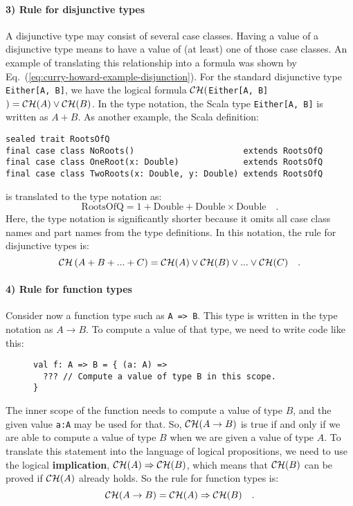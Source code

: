 \paragraph{3) Rule for disjunctive types}

A disjunctive type may consist of several case classes. Having a value
of a disjunctive type means to have a value of (at least) one of those
case classes. An example of translating this relationship into a formula
was shown by Eq.~(\ref{eq:curry-howard-example-disjunction}). For
the standard disjunctive type \lstinline!Either[A, B]!, we have the
logical formula ${\cal CH}($\lstinline!Either[A, B]!$)={\cal CH}(A)\vee{\cal CH}(B)$.
In the type notation, the Scala type \lstinline!Either[A, B]! is
written as $A+B$. As another example, the Scala definition:
\begin{lstlisting}
sealed trait RootsOfQ
final case class NoRoots()                      extends RootsOfQ
final case class OneRoot(x: Double)             extends RootsOfQ
final case class TwoRoots(x: Double, y: Double) extends RootsOfQ
\end{lstlisting}
is translated to the type notation as:
\[
\text{RootsOfQ}=1+\text{Double}+\text{Double}\times\text{Double}\quad.
\]
Here, the type notation is significantly shorter because it omits
all case class names and part names from the type definitions. In
this notation, the rule for disjunctive types is:
\[
{\cal CH}\left(A+B+...+C\right)={\cal CH}(A)\vee{\cal CH}(B)\vee...\vee{\cal CH}(C)\quad.
\]


\paragraph{4) Rule for function types}

Consider now a function type such as \lstinline!A => B!. This type
is written in the type notation as $A\rightarrow B$. To compute a
value of that type, we need to write code like this:

\begin{wrapfigure}{l}{0.5\columnwidth}%
\vspace{-0.65\baselineskip}
\begin{lstlisting}
val f: A => B = { (a: A) =>
  ??? // Compute a value of type B in this scope.
}
\end{lstlisting}

\vspace{-0.9\baselineskip}
\end{wrapfigure}%

\noindent The inner scope of the function needs to compute a value
of type $B$, and the given value \lstinline!a:A! may be used for
that. So, ${\cal CH}(A\rightarrow B)$ is true if and only if we are
able to compute a value of type $B$ when we are given a value of
type $A$. To translate this statement into the language of logical
propositions, we need to use the logical
\textbf{implication}, ${\cal CH}(A)\Rightarrow{\cal CH}(B)$, which
means that ${\cal CH}(B)$ can be proved if ${\cal CH}(A)$ already
holds. So the rule for function types is:
\[
{\cal CH}(A\rightarrow B)={\cal CH}(A)\Rightarrow{\cal CH}(B)\quad.
\]


